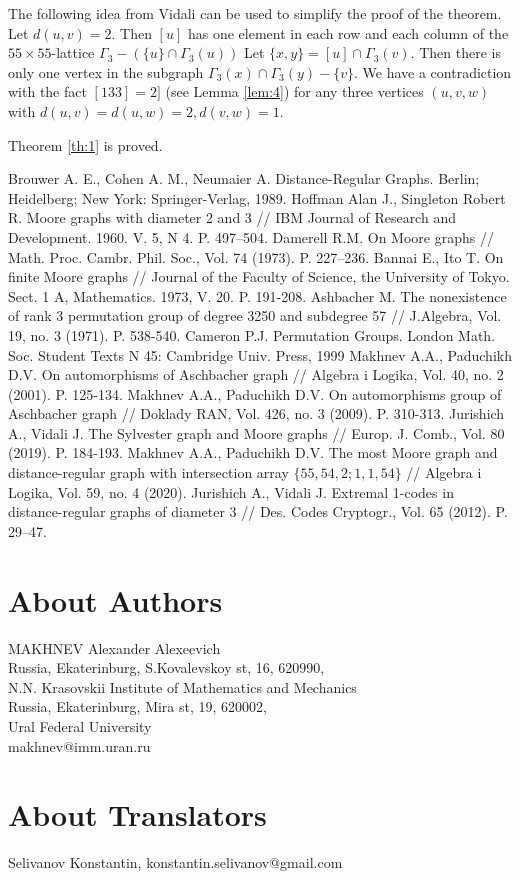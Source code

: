 \documentclass{article}
\theoremstyle{definition}
\theoremstyle{definition}
\theoremstyle{remark}
\begin{document}
The following idea from Vidali can be used to simplify the proof of the theorem. Let $d(u, v) = 2$. Then $[u]$ has one element in each row and each column of the $55 \times 55$-lattice $\Gamma_3 - (\{u\} \cap \Gamma_3(u))$
Let $\{x, y\} = [u] \cap \Gamma_3 (v)$. Then there is only one vertex in the subgraph $\Gamma_3(x) \cap \Gamma_3(y) - \{v\}$. We have a contradiction with the fact $[133] = 2]$ (see Lemma \ref{lem:4}) for any three vertices $(u,v,w)$ with $d(u, v) = d(u, w) = 2, d(v, w) = 1$.

Theorem \ref{th:1} is proved.

\begin{thebibliography}{}

 Brouwer A. E., Cohen A. M., Neumaier A. Distance-Regular Graphs. Berlin; Heidelberg; New York: Springer-Verlag, 1989.
 Hoﬀman Alan J., Singleton Robert R. Moore graphs with diameter 2 and 3 // IBM Journal of Research and Development. 1960. V. 5, N 4. P. 497–504.
 Damerell R.M. On Moore graphs // Math. Proc. Cambr. Phil. Soc., Vol. 74 (1973). P. 227–236.
 Bannai E., Ito T. On ﬁnite Moore graphs // Journal of the Faculty of Science, the University of Tokyo. Sect. 1 A, Mathematics. 1973, V. 20. P. 191-208.
 Ashbacher M. The nonexistence of rank 3 permutation group of degree 3250 and subdegree 57 // J.Algebra, Vol. 19, no. 3 (1971). P. 538-540.
 Cameron P.J. Permutation Groups. London Math. Soc. Student Texts N 45: Cambridge Univ. Press, 1999
 Makhnev A.A., Paduchikh D.V. On automorphisms of Aschbacher graph // Algebra i Logika, Vol. 40, no. 2 (2001). P. 125-134.
 Makhnev A.A., Paduchikh D.V. On automorphisms group of Aschbacher graph // Doklady RAN, Vol. 426, no. 3 (2009). P. 310-313.
 Jurishich A., Vidali J. The Sylvester graph and Moore graphs // Europ. J. Comb., Vol. 80 (2019). P. 184-193.
 Makhnev A.A., Paduchikh D.V. The most Moore graph and distance-regular graph with intersection array $\{55, 54, 2; 1, 1, 54\}$ // Algebra i Logika, Vol. 59, no. 4 (2020).
 Jurishich A., Vidali J. Extremal 1-codes in distance-regular graphs of diameter 3 // Des. Codes Cryptogr., Vol. 65 (2012). P. 29–47.
\end{thebibliography}

\section*{About Authors}
MAKHNEV Alexander Alexeevich \\
Russia, Ekaterinburg, S.Kovalevskoy st, 16, 620990, \\
N.N. Krasovskii Institute of Mathematics and Mechanics \\
Russia, Ekaterinburg, Mira st, 19, 620002, \\
Ural Federal University \\
makhnev@imm.uran.ru

\section*{About Translators}
Selivanov Konstantin, konstantin.selivanov@gmail.com
\end{document}
